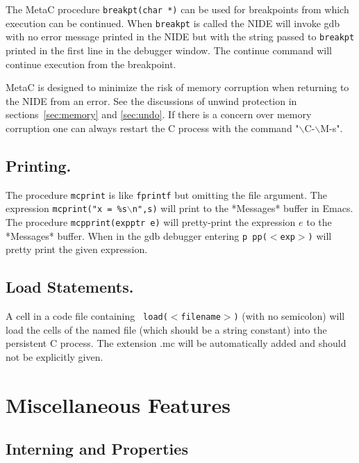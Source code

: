 \documentclass{article}
\begin{document}
The MetaC procedure {\tt breakpt(char *)} can be used for breakpoints
from which execution can be continued.  When {\tt breakpt} is called
the NIDE will invoke gdb with no error message printed in the NIDE but with the string passed to {\tt breakpt} printed in the first line in
the debugger window. The continue command will continue execution from the breakpoint.

MetaC is designed to minimize the risk of memory corruption
when returning to the NIDE from an error.
See the discussions of unwind protection in sections~\ref{sec:memory} and \ref{sec:undo}.
If there is a concern over memory corruption one can always restart the C process with the command "$\backslash$C-$\backslash$M-s".

\subsection {Printing.} The procedure {\tt mcprint} is like {\tt fprintf} but omitting the file argument. The expression
{\tt mcprint("x = \%s$\backslash$n",s)} will print to the *Messages* buffer in Emacs. The procedure {\tt mcpprint(expptr e)}
will pretty-print the expression $e$ to the *Messages* buffer.  When in the gdb debugger entering {\tt p pp($<$exp$>$)} will
pretty print the given expression.

\subsection{Load Statements.}  A cell in a code file containing {\tt
load($<$filename$>$)} (with no semicolon) will load the cells
of the named file (which should be a string constant) into the persistent C process.  The extension .mc
will be automatically added and should not be explicitly given.

\section{Miscellaneous Features}

\subsection{Interning and Properties}
\end{document}
